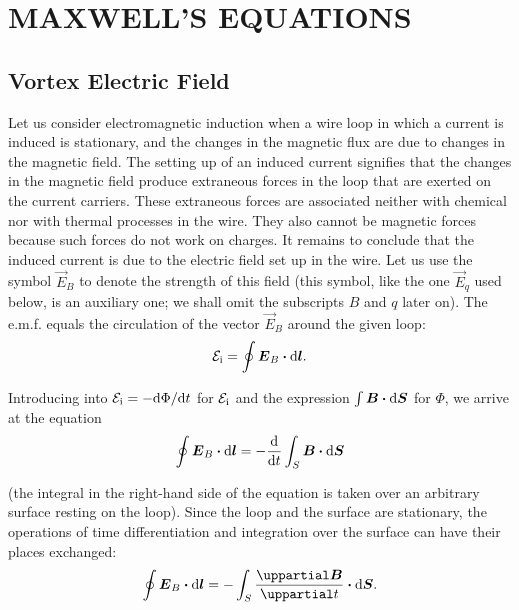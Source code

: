 

\chapter[MAXWELL'S EQUATIONS]{MAXWELL'S EQUATIONS}\label{chap:9}

\section{Vortex Electric Field}\label{sec:9_1}

Let us consider electromagnetic induction when a wire loop in which a current is induced is stationary, and the changes in the magnetic flux are due to changes in the magnetic field.
The setting up of an induced current signifies that the changes in the magnetic field produce extraneous forces in the loop that are exerted on the current carriers.
These extraneous forces are associated neither with chemical nor with thermal processes in the wire.
They also cannot be magnetic forces because such forces do not work on charges.
It remains to conclude that the induced current is due to the electric field set up in the wire.
Let us use the symbol $\vec{E}_B$ to denote the strength of this field (this symbol, like the one $\vec{E}_q$ used below, is an auxiliary one; we shall omit the subscripts $B$ and $q$ later on).
The e.m.f. equals the circulation of the vector $\vec{E}_B$ around the given loop:
\begin{equation}\label{eq:9_1}
    \mathcal{E}_{\text{i}} = \oint \boldsymbol{E}_B \boldsymbol{\cdot} \mathrm{d}\boldsymbol{l}.
\end{equation}

Introducing into  $\mathcal{E}_{\text{i}} = -\mathrm{d}\Phi/\mathrm{d} t$ for $\mathcal{E}_{\text{i}}$ and the expression $\int\boldsymbol{B}\boldsymbol{\cdot}\mathrm{d}\boldsymbol{S}$ for $\Phi$, we arrive at the equation
\begin{equation*}
    \oint \boldsymbol{E}_B \boldsymbol{\cdot} \mathrm{d}\boldsymbol{l} = -\dfrac{\mathrm{d}}{\mathrm{d} t} \int_S \boldsymbol{B} \boldsymbol{\cdot} \mathrm{d}\boldsymbol{S}
\end{equation*}

\noindent
(the integral in the right-hand side of the equation is taken over an arbitrary surface resting on the loop).
Since the loop and the surface are stationary, the operations of time differentiation and integration over the surface can have their places exchanged:
\vspace{-12pt}
\begin{equation}\label{eq:9_2}
    \oint \vec{E}_B \ccdot \derivec{l} =  - \int_S \diffpartial{\vec{B}}{t} \ccdot \derivec{S}.
\end{equation}


